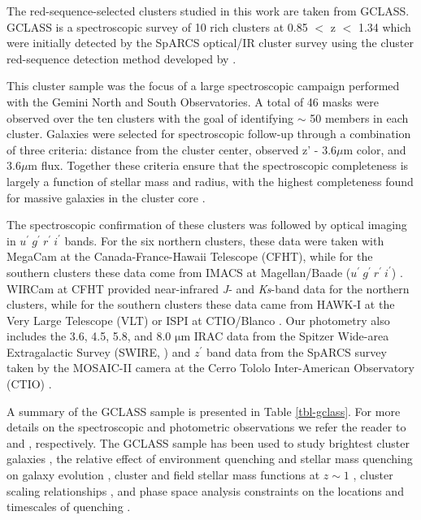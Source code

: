 The red-sequence-selected clusters studied in this work are taken from GCLASS. GCLASS is a spectroscopic survey of 10 rich clusters at 0.85 $<$ z $<$ 1.34 which were initially detected by the SpARCS optical/IR cluster survey using the cluster red-sequence detection method developed by \cite{Gladders:2000rq} \citep[see][]{Muzzin:2009jm,Wilson:2009ws,Demarco:2010om}.

This cluster sample was the focus of a large spectroscopic campaign performed with the Gemini North and South Observatories. A total of 46 masks were observed over the ten clusters with the goal of identifying $\sim$ 50 members in each cluster. Galaxies were selected for spectroscopic follow-up through a combination of three criteria: distance from the cluster center, observed z' - 3.6$\mu$m color, and 3.6$\mu$m flux. Together these criteria ensure that the spectroscopic completeness is largely a function of stellar mass and radius, with the highest completeness found for massive galaxies in the cluster core \citep{Muzzin:2012dw}. %

The spectroscopic confirmation of these clusters was followed by optical imaging in $u^\prime\ g^\prime\ r^\prime\ i^\prime$ bands. For the six northern clusters, these data were taken with MegaCam at the Canada-France-Hawaii Telescope (CFHT), while for the southern clusters these data come from IMACS at Magellan/Baade ($u^\prime\ g^\prime\ r^\prime\ i^\prime$) . WIRCam at CFHT provided near-infrared \textit{J}- and \textit{Ks}-band data for the northern clusters, while for the southern clusters these data came from HAWK-I at the Very Large Telescope (VLT) or ISPI at CTIO/Blanco \citep{van-der-Burg:2013zn}. Our photometry also includes the 3.6, 4.5, 5.8, and 8.0 $\mathrm{\mu}$m IRAC data from the Spitzer Wide-area Extragalactic Survey (SWIRE, \citet{Lonsdale:2003ow}) and $z^\prime$ band data from the SpARCS survey taken by the MOSAIC-II camera at the Cerro Tololo Inter-American Observatory (CTIO)
\citep[see][for details on the Northern and Southern $z^\prime$ observations, respectively]{Muzzin:2009jm,Wilson:2009ws}.

A summary of the GCLASS sample is presented in Table \ref{tbl-gclass}. For more details on the spectroscopic and photometric observations we refer the reader to \citet{Muzzin:2012dw} and \citet{van-der-Burg:2013zn}, respectively.  The GCLASS sample has been used to study brightest cluster galaxies \citep[][Rettura et al., in prep.]{Lidman:2012il,Lidman:2013vp}, the relative effect of environment quenching and stellar mass quenching on galaxy evolution \citep{Muzzin:2012dw}, cluster and field stellar mass functions at $z\sim1$ \citep{van-der-Burg:2013zn}, cluster scaling relationships \citep{van-der-Burg:2014bs}, and phase space analysis constraints on the locations and timescales of quenching \citep{Noble:2013vh,Muzzin:2014sf}.

